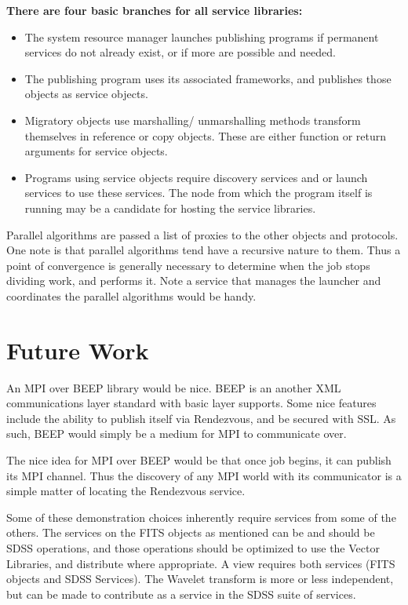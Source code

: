 \documentclass[11pt]{article}
\begin{document}
\newpage
\begin{Large}
\textbf{There are four basic branches for all service libraries:}
\begin{itemize}
\item The system resource manager launches publishing programs if permanent services do not already exist, or if more are possible and needed.
\item The publishing program uses its associated frameworks, and publishes those objects as service objects.
\item Migratory objects use marshalling/ unmarshalling methods transform themselves in reference or copy objects.  These are either function or return arguments for service objects.  
\item Programs using service objects require discovery services and or launch services to use these services.  The node from which the program itself is running may be a candidate for hosting the service libraries.  
\end{itemize}
Parallel algorithms are passed a list of proxies to the other objects and protocols.    One note is that parallel algorithms tend have a recursive nature to them.  Thus a point of convergence is generally necessary to determine when the job stops dividing work, and performs it.   Note a service that manages the launcher and coordinates the parallel algorithms would be handy.  

\end{Large}


\section {Future Work}
An MPI over BEEP library would be nice.  
BEEP is an another XML communications layer standard with basic layer supports.  Some nice features include the ability to publish itself via Rendezvous, and be secured with SSL.   As such, BEEP would simply be a medium for MPI to communicate over.  

The nice idea for MPI over BEEP would be that once job begins, it can publish its MPI channel.  Thus the discovery of any MPI world with its communicator is a simple matter of locating the Rendezvous service.  


Some of these demonstration choices inherently require services from some of the others.  The services on the FITS objects as mentioned can be and should be SDSS operations, and those operations should be optimized to use the Vector Libraries, and distribute where appropriate.  A view requires both services (FITS objects and SDSS Services).    The Wavelet transform is more or less independent, but can be made to contribute as a service in the SDSS suite of services.  
\end{document}
